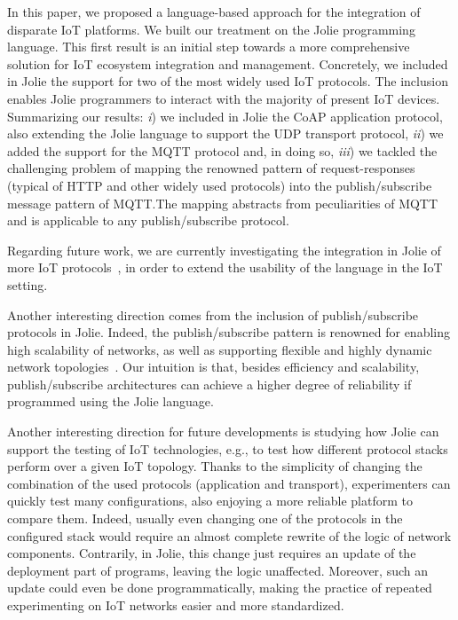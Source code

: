 In this paper, we proposed a language-based approach for the integration of
disparate IoT platforms. We built our treatment on the Jolie programming
language. This first result is an initial step towards a more comprehensive
solution for IoT ecosystem integration and management. Concretely, we included
in Jolie the support for two of the most widely used IoT protocols. The
inclusion enables Jolie programmers to interact with the majority of present IoT
devices. Summarizing our results: \emph{i}) we included in Jolie the CoAP
application protocol, also extending the Jolie language to support the UDP
transport protocol, \emph{ii}) we added the support for the MQTT protocol and,
in doing so, \emph{iii}) we tackled the challenging problem of mapping the
renowned pattern of request-responses (typical of HTTP and other widely used
protocols) into the publish/subscribe message pattern of MQTT.\@ The mapping
abstracts from peculiarities of MQTT and is applicable to any publish/subscribe
protocol.

Regarding future work, we are currently investigating the integration in Jolie
of more IoT protocols~\cite{7123563}, in order to extend the usability of the
language in the IoT setting.

Another interesting direction comes from the inclusion of publish/subscribe
protocols in Jolie. Indeed, the publish/subscribe pattern is renowned for
enabling high scalability of networks, as well as supporting flexible and highly
dynamic network topologies~\cite{eugster03}. Our intuition is that, besides
efficiency and scalability, publish/subscribe architectures can achieve a higher
degree of reliability if programmed using the Jolie language. 

Another interesting direction for future developments is studying how Jolie
can support the testing of IoT technologies, e.g., to test how
different protocol stacks perform over a given IoT topology. Thanks to the
simplicity of changing the combination of the used protocols (application and
transport), experimenters can quickly test many configurations, also enjoying
a more reliable platform to compare them. Indeed, usually even changing one
of the protocols in the configured stack would require an almost complete
rewrite of the logic of network components. Contrarily, in Jolie, this change
just requires an update of the deployment part of programs, leaving the logic
unaffected. Moreover, such an update could even be done programmatically,
making the practice of repeated experimenting on IoT networks easier and more
standardized.

